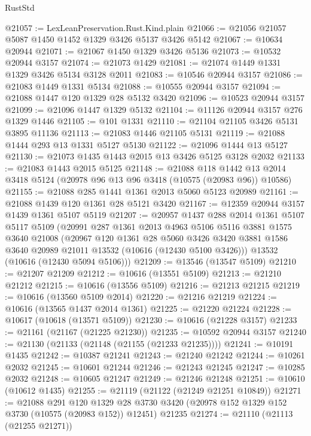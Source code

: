 \begin{lexlean}{RustStd}
\begin{coremodule}
@21057 := LexLeanPreservation.Rust.Kind.plain
@21066 := @21056 @21057 @5087 @1450 @1452 @1329 @3426 @5137 @3426 @5142
@21067 := @10634 @20944
@21071 := @21067 @1450 @1329 @3426 @5136
@21073 := @10532 @20944 @3157
@21074 := @21073 @1429
@21081 := @21074 @1449 @1331 @1329 @3426 @5134 @3128 @2011
@21083 := @10546 @20944 @3157
@21086 := @21083 @1449 @1331 @5134
@21088 := @10555 @20944 @3157
@21094 := @21088 @1447 @120 @1329 @28 @5132 @3420
@21096 := @10523 @20944 @3157
@21099 := @21096 @1447 @1329 @5132
@21104 := @11126 @20944 @3157 @276 @1329 @1446
@21105 := @101 @1331
@21110 := @21104 @21105 @3426 @5131 @3895 @11136
@21113 := @21083 @1446 @21105 @5131
@21119 := @21088 @1444 @293 @13 @1331 @5127 @5130
@21122 := @21096 @1444 @13 @5127
@21130 := @21073 @1435 @1443 @2015 @13 @3426 @5125 @3128 @2032
@21133 := @21083 @1443 @2015 @5125
@21148 := @21088
    @118
    @1442
    @13
    @2014
    @3418
    @5124
    (@20978 @96 @13 @96 @3418 (@10575 (@20983 @96)) @10586)
@21155 := @21088 @285 @1441 @1361 @2013 @5060 @5123 @20989
@21161 := @21088 @1439 @120 @1361 @28 @5121 @3420
@21167 := @12359 @20944 @3157 @1439 @1361 @5107 @5119
@21207 := @20957
    @1437
    @288
    @2014
    @1361
    @5107
    @5117
    @5109
    (@20991
      @287
      @1361
      @2013
      @4963
      @5106
      @5116
      @3881
      @1575
      @3640
      @21008
      (@20967
        @120
        @1361
        @28
        @5060
        @3426
        @3420
        @3881
        @1586
        @3640
        @20989
        @21011
        @13532
        (@10616 (@12430 @5100 @3426)))
      @13532
      (@10616 (@12430 @5094 @5106)))
@21209 := @13546 (@13547 @5109)
@21210 := @21207 @21209
@21212 := @10616 (@13551 @5109)
@21213 := @21210 @21212
@21215 := @10616 (@13556 @5109)
@21216 := @21213 @21215
@21219 := @10616 (@13560 @5109 @2014)
@21220 := @21216 @21219
@21224 := @10616 (@13565 @1437 @2014 @1361)
@21225 := @21220 @21224
@21228 := @10617 (@10618 (@13571 @5109))
@21230 := @10616 (@21228 @3157)
@21233 := @21161 (@21167 (@21225 @21230))
@21235 := @10592 @20944 @3157
@21240 := @21130 (@21133 (@21148 (@21155 (@21233 @21235))))
@21241 := @10191 @1435
@21242 := @10387 @21241
@21243 := @21240 @21242
@21244 := @10261 @2032
@21245 := @10601 @21244
@21246 := @21243 @21245
@21247 := @10285 @2032
@21248 := @10605 @21247
@21249 := @21246 @21248
@21251 := @10610 (@10612 @1435)
@21255 := @21119 (@21122 (@21249 @21251 @10849))
@21271 := @21088
    @291
    @120
    @1329
    @28
    @3730
    @3420
    (@20978 @152 @1329 @152 @3730 (@10575 (@20983 @152)) @12451)
    @21235
@21274 := @21110 (@21113 (@21255 @21271))

\end{coremodule}
\end{lexlean}
